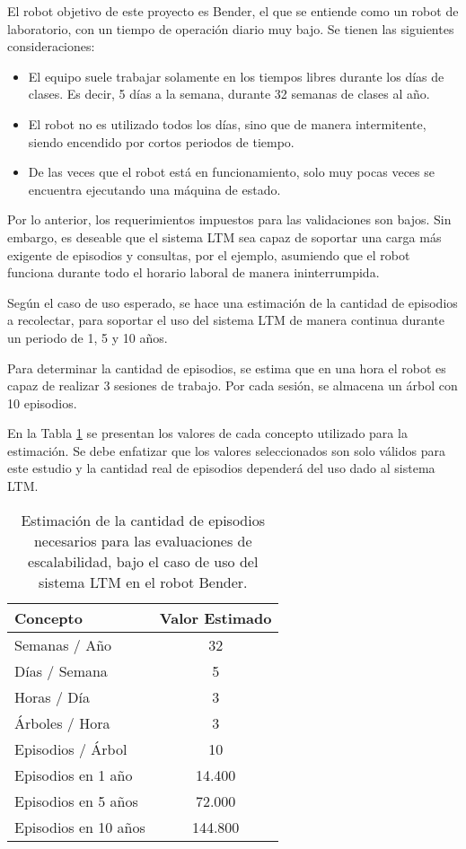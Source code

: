 El robot objetivo de este proyecto es Bender, el que se entiende como un robot de laboratorio, con un tiempo de operación diario muy bajo. Se tienen las siguientes consideraciones:
\begin{itemize}
\item El equipo suele trabajar solamente en los tiempos libres durante los días de clases. Es decir, 5 días a la semana, durante 32 semanas de clases al año.
\item El robot no es utilizado todos los días, sino que de manera intermitente, siendo encendido por cortos periodos de tiempo.
\item De las veces que el robot está en funcionamiento, solo muy pocas veces se encuentra ejecutando una máquina de estado.
\end{itemize}

Por lo anterior, los requerimientos impuestos para las validaciones son bajos. Sin embargo, es deseable que el sistema LTM sea capaz de soportar una carga más exigente de episodios y consultas, por el ejemplo, asumiendo que el robot funciona durante todo el horario laboral de manera ininterrumpida.

Según el caso de uso esperado, se hace una estimación de la cantidad de episodios a recolectar, para soportar el uso del sistema LTM de manera continua durante un periodo de 1, 5 y 10 años. 

Para determinar la cantidad de episodios, se estima que en una hora el robot es capaz de realizar 3 sesiones de trabajo. Por cada sesión, se almacena un árbol con 10 episodios. 

En la Tabla \ref{table:escalabilidad} se presentan los valores de cada concepto utilizado para la estimación. Se debe enfatizar que los valores seleccionados son solo válidos para este estudio y la cantidad real de episodios dependerá del uso dado al sistema LTM.

\begin{table}[H]
	\centering
	\begin{tabular}{|l|c|}
		\hline
		\rowcolor{gray!50}
		Concepto & Valor Estimado \\ \hline
		Semanas / Año	&  32 \\  \hline
		Días / Semana	&  5 \\  \hline
		Horas / Día     &  3 \\  \hline
		Árboles / Hora  &  3 \\  \hline
		Episodios / Árbol & 10 \\  \hline \hline
		Episodios en 1 año  & 14.400  \\  \hline 
		Episodios en 5 años  & 72.000  \\  \hline 
		Episodios en 10 años  & 144.800  \\  \hline 		
	\end{tabular} 
	\caption[Estimaciones para validación de escalabilidad]
	{\small Estimación de la cantidad de episodios necesarios para las evaluaciones de escalabilidad, bajo el caso de uso del sistema LTM en el robot Bender.}
	\label{table:escalabilidad}
\end{table}


